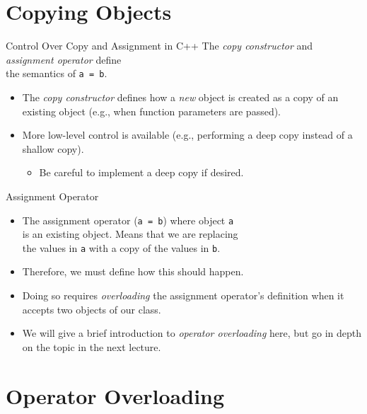 \documentclass[14pt, aspectratio=1610, hyperref={pdfpagelayout=SinglePage}]{beamer}
\begin{document}
\section{Copying Objects}

\begin{frame}{Control Over Copy and Assignment in C++}
The \emph{copy constructor} and \emph{assignment operator} define\\ the semantics of \lstinline{a = b}.
\begin{itemize}
  \item<2->
    The \textit{copy constructor} defines how a \emph{new} object is created as a copy of an existing object (e.g., when function parameters are passed).
  \item<3->
    More low-level control is available (e.g., performing a deep copy instead of a shallow copy).
    \begin{itemize}
      \item
        Be careful to implement a deep copy if desired.
    \end{itemize}
\end{itemize}
\end{frame}

\begin{frame}{Assignment Operator}
  \begin{itemize}[<+->]
    \item
      The assignment operator (\lstinline{a = b}) where object \lstinline{a} \\
      is an existing object. Means that we are replacing\\ the values in \lstinline{a} with a copy of the values in \lstinline{b}.

    \item
      Therefore, we must define how this should happen.

    \item
      Doing so requires \emph{overloading} the assignment operator's definition when it accepts two objects of our class.

    \item
      We will give a brief introduction to \emph{operator overloading} here, but go in depth on the topic in the next lecture.
  \end{itemize}
\end{frame}

\section{Operator Overloading}
\end{document}
